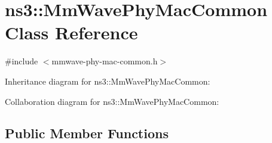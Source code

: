 \hypertarget{classns3_1_1MmWavePhyMacCommon}{}\section{ns3\+:\+:Mm\+Wave\+Phy\+Mac\+Common Class Reference}
\label{classns3_1_1MmWavePhyMacCommon}


{\ttfamily \#include $<$mmwave-\/phy-\/mac-\/common.\+h$>$}



Inheritance diagram for ns3\+:\+:Mm\+Wave\+Phy\+Mac\+Common\+:


Collaboration diagram for ns3\+:\+:Mm\+Wave\+Phy\+Mac\+Common\+:
\subsection*{Public Member Functions}
